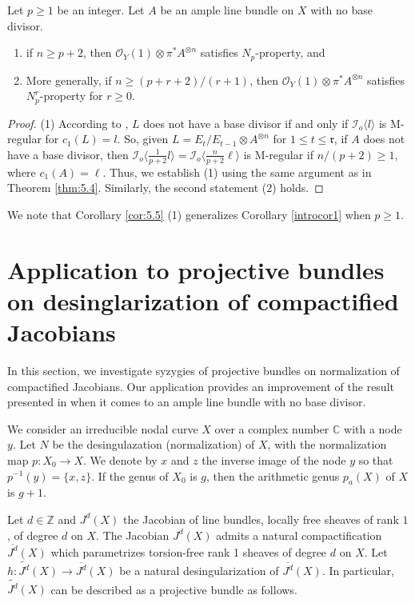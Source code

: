 \documentclass[11pt,letter]{amsart}
\numberwithin{equation}{section}
\begin{document}
\begin{cor}\label{cor:5.5}
Let $p\geq 1$ be an integer. Let $A$ be an ample line bundle on $X$ with no base divisor. 
\begin{enumerate}
\item if $n\geq p+2$, then $\mathcal{O}_Y(1)\otimes\pi^*A^{\otimes n}$ satisfies $N_p$-property, and
\item More generally, if $n\geq (p+r+2)/(r+1)$, then $\mathcal{O}_Y(1)\otimes\pi^*A^{\otimes n}$ satisfies $N_p^r$-property for $r\geq 0$. 
\end{enumerate}
\end{cor}
\begin{proof}
(1) According to \cite[Remark 3.6]{PP04}, $L$ does not have a base divisor if and only if $\mathcal{I}_o\langle l\rangle$ is M-regular for $c_1(L)=l$. So, given $L=E_t/E_{t-1}\otimes A^{\otimes n}$ for $1\leq t\leq \mathfrak{r}$, if $A$ does not have a base divisor, then $\mathcal{I}_o\langle\frac{1}{p+2}l\rangle=\mathcal{I}_o\langle\frac{n}{p+2}\ell\rangle$ is M-regular if ${n}/({p+2})\geq 1$, where $c_1(A)=\ell$. Thus, we establish (1) using the same argument as in Theorem \ref{thm:5.4}. Similarly, the second statement (2) holds.
\end{proof}

We note that Corollary \ref{cor:5.5} (1) generalizes Corollary \ref{introcor1} when $p\geq 1$.



\section{Application to projective bundles on desinglarization of compactified Jacobians}\label{sec5}


In this section, we investigate syzygies of projective bundles on normalization of compactified Jacobians. Our application provides an improvement of the result presented in \cite[Theorem 5.4]{Chi19} when it comes to an ample line bundle with no base divisor. 

We consider an irreducible nodal curve $X$ over a complex number $\mathbb{C}$ with a node $y$. Let $N$ be the desingulazation (normalization) of $X$, with the normalization map $p:X_0\rightarrow X$. We denote by $x$ and $z$ the inverse image of the node $y$ so that $p^{-1}(y)=\{x,z\}$. If the genus of $X_0$ is $g$, then the arithmetic genus $p_a(X)$ of $X$ is $g+1$. 

Let $d\in \mathbb{Z}$ and $J^d(X)$ the Jacobian of line bundles, locally free sheaves of rank $1$, of degree $d$ on $X$. The Jacobian $J^d(X)$ admits a natural compactification $\overline{J^d}(X)$ which parametrizes torsion-free rank 1 sheaves of degree $d$ on $X$. Let $h:\widetilde{J^d}(X)\rightarrow\overline{J^d}(X)$ be a natural desingularization of $\overline{J^d}(X)$. 
In particular, $\widetilde{J^d}(X)$ can be described as a projective bundle as follows.
\end{document}
